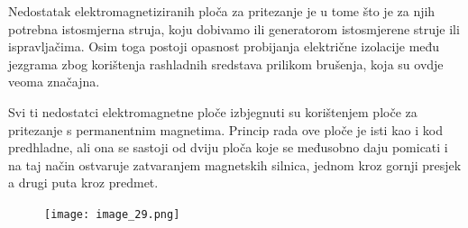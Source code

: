 \documentclass[a4paper,12pt]{article}
\numberwithin{figure}{section}
\begin{document}
Nedostatak elektromagnetiziranih ploča za pritezanje je u tome što je za njih potrebna istosmjerna struja, koju dobivamo ili generatorom istosmjerene struje ili ispravljačima. Osim toga postoji opasnost probijanja električne izolacije među jezgrama zbog korištenja rashladnih sredstava prilikom brušenja, koja su ovdje veoma značajna.\par
Svi ti nedostatci elektromagnetne ploče izbjegnuti su korištenjem ploče za pritezanje s permanentnim magnetima. Princip rada ove ploče je isti kao i kod predhladne, ali ona se sastoji od dviju ploča koje se međusobno daju pomicati i na taj način ostvaruje zatvaranjem magnetskih silnica, jednom kroz gornji presjek a drugi puta kroz predmet. 
\begin{figure}[!h]
\centering
\texttt{[image: image\_29.png]}
\end{figure}
\FloatBarrier
\end{document}
